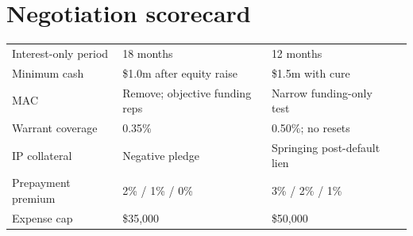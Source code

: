 \section{Negotiation scorecard}

\begin{tabularx}{\textwidth}{@{}L{0.28\textwidth}L{0.21\textwidth}L{0.21\textwidth}Y@{}}
\toprule
{}
 &  &  &  \\
\midrule
Interest-only period & 18 months & 12 months &  \\
Minimum cash & \$1.0m after equity raise & \$1.5m with cure &  \\
MAC & Remove; objective funding reps & Narrow funding-only test &  \\
Warrant coverage & 0.35\% & 0.50\%; no resets &  \\
IP collateral & Negative pledge & Springing post-default lien &  \\
Prepayment premium & 2\% / 1\% / 0\% & 3\% / 2\% / 1\% &  \\
Expense cap & \$35,000 & \$50,000 &  \\
\bottomrule
\end{tabularx}
